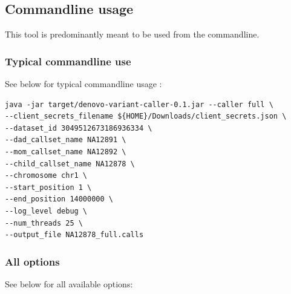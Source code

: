 \documentclass{article}
\begin{document}
\subsection{Commandline usage}
This tool is predominantly meant to be used from the commandline.

\subsubsection*{Typical commandline use}
See below for typical commandline usage : 

\begin{verbatim}
java -jar target/denovo-variant-caller-0.1.jar --caller full \
--client_secrets_filename ${HOME}/Downloads/client_secrets.json \
--dataset_id 3049512673186936334 \
--dad_callset_name NA12891 \
--mom_callset_name NA12892 \
--child_callset_name NA12878 \
--chromosome chr1 \
--start_position 1 \
--end_position 14000000 \
--log_level debug \
--num_threads 25 \
--output_file NA12878_full.calls
\end{verbatim}


\subsubsection*{All options}
See below for all available options:
\end{document}
